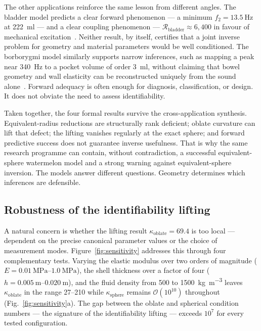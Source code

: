 The other applications reinforce the same lesson from different angles.  The
bladder model predicts a clear forward phenomenon --- a minimum
$f_2=\SI{13.5}{\hertz}$ at \SI{222}{\milli\litre} --- and a clear coupling
phenomenon --- $\mathcal{R}_\mathrm{bladder}\approx 6{,}400$ in favour of
mechanical excitation~\cite{BrowntoneP4}.  Neither result, by itself, certifies
that a joint inverse problem for geometry and material parameters would be well
conditioned.  The borborygmi model similarly supports narrow inferences, such as
mapping a peak near \SI{340}{\hertz} to a pocket volume of order
\SI{3}{\milli\litre}, without claiming that bowel geometry and wall elasticity
can be reconstructed uniquely from the sound alone~\cite{BrowntoneP5}.  Forward
adequacy is often enough for diagnosis, classification, or design.  It does not
obviate the need to assess identifiability.

Taken together, the four formal results survive the cross-application
synthesis.  Equivalent-radius reductions are structurally rank deficient;
oblate curvature can lift that defect; the lifting vanishes regularly at the
exact sphere; and forward predictive success does not guarantee inverse
usefulness.
That is why the same research programme can contain, without contradiction, a
successful equivalent-sphere watermelon model and a strong warning against
equivalent-sphere inversion.  The models answer different questions.  Geometry
determines which inferences are defensible.

\subsection{Robustness of the identifiability lifting}
\label{sec:robustness}

A natural concern is whether the lifting result
$\kappa_\mathrm{oblate}=69.4$ is too local --- dependent on the precise
canonical parameter values or the choice of measurement modes.
Figure~\ref{fig:sensitivity} addresses this through four complementary tests.
Varying the elastic modulus over two orders of magnitude
($E=\SIrange{0.01}{1.0}{\mega\pascal}$), the shell thickness over a factor of
four ($h=\SIrange{0.005}{0.020}{\metre}$), and the fluid density from 500 to
\SI{1500}{\kilogram\per\metre\cubed} leaves
$\kappa_\mathrm{oblate}$ in the range 27--210 while
$\kappa_\mathrm{sphere}$ remains $\mathcal{O}(10^{10})$ throughout
(Fig.~\ref{fig:sensitivity}a).  The gap between the oblate and spherical
condition numbers --- the signature of the identifiability lifting --- exceeds
$10^{7}$ for every tested configuration.

